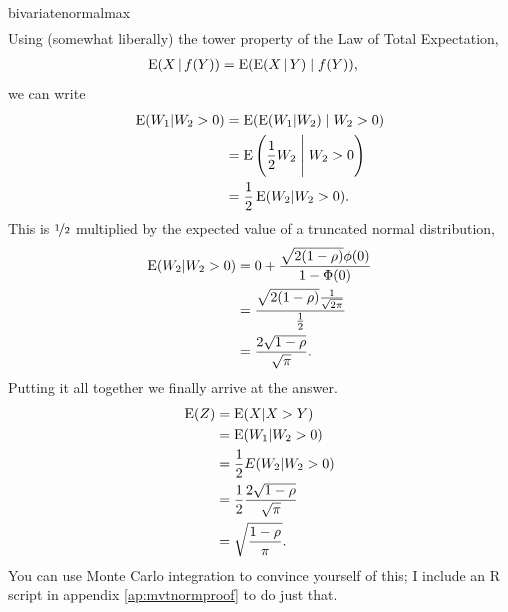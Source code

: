 \begin{answer}{bivariatenormalmax}
\begin{align*}
\end{align*}
Using (somewhat liberally) the tower property of the Law of Total Expectation,
\begin{align*}
\operatorname{\mathrm{E}}(X \, | \, f(Y)) &=
\operatorname{\mathrm{E}}( \operatorname{\mathrm{E}}(X\,|\,Y) \; | \; f(Y))
\text{,}
\end{align*}
we can write
\begin{align*}
\operatorname{\mathrm{E}}(W_1|W_2 > 0 )
&=
\operatorname{\mathrm{E}}( \operatorname{\mathrm{E}}(  W_1| W_2) \;|\; W_2 > 0 ) \\
&= \operatorname{\mathrm{E}}\left( \frac{1}{2}W_2 \; \Bigg| \; W_2>0 \right) \\
&= \frac{1}{2}\operatorname{\mathrm{E}}( W_2 | W_2>0 )
\text{.}
\end{align*}
This is $\nicefrac{1}{2}$ multiplied by the expected value of a truncated normal distribution,
\begin{align}
\operatorname{\mathrm{E}}(W_2|W_2 > 0)
&= 0 + \frac{ \sqrt{2( 1- \rho)} \phi(0)}{1- \Phi(0)} \label{eq:bivariatenormalmax:conditional_expecation2} \\
&=  \frac{ \sqrt{2( 1- \rho)} \frac{1}{\sqrt{2 \pi}} }{\frac{1}{2}} \nonumber \\
&=  \frac{ 2 \sqrt{ 1- \rho}  }{ \sqrt{ \pi} } \nonumber
\text{.}
\end{align}
Putting it all together we finally arrive at the answer.
\begin{align*}
\operatorname{\mathrm{E}}(Z) &=  \operatorname{\mathrm{E}}(X|X > Y)  \\
      &= \operatorname{\mathrm{E}}(W_1|W_2 > 0 ) \\
      &= \frac{1}{2}E(W_2|W_2>0) \\
      &=  \frac{1}{2}\frac{ 2 \sqrt{ 1- \rho}  }{ \sqrt{ \pi} } \\
      &=  \sqrt{\frac{ 1- \rho  }{ \pi }}
\text{.}
\end{align*}
You can use Monte Carlo integration to convince yourself of this; I include an R script in appendix \ref{ap:mvtnormproof} to do just that.





\end{answer}

